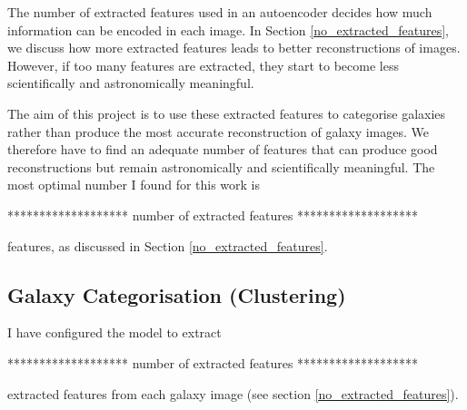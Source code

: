 \documentclass[12pt, onecolumn]{article}
\begin{document}
        The number of extracted features used in an autoencoder decides how much information can be encoded in each image. In Section \ref{no_extracted_features}, we discuss how more extracted features leads to better reconstructions of images. However, if too many features are extracted, they start to become less scientifically and astronomically meaningful.
        
        The aim of this project is to use these extracted features to categorise galaxies rather than produce the most accurate reconstruction of galaxy images. We therefore have to find an adequate number of features that can produce good reconstructions but remain astronomically and scientifically meaningful. The most optimal number I found for this work is 
        
        \vspace{5mm}
        ******************* number of extracted features *******************
        \vspace{5mm}
        
        features, as discussed in Section \ref{no_extracted_features}.
    
    
    
    \subsection{Galaxy Categorisation (Clustering)}
    \label{Clustering}



        I have configured the model to extract 

        \vspace{5mm}
        ******************* number of extracted features *******************
        \vspace{5mm}

        extracted features from each galaxy image (see section \ref{no_extracted_features}).
        
\end{document}
